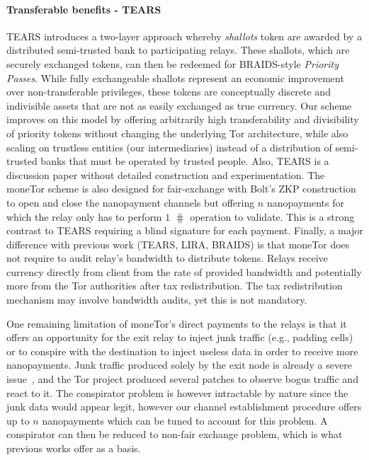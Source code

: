 \paragraph*{Transferable benefits - TEARS} TEARS introduces a two-layer approach whereby \emph{shallots}
token are awarded by a distributed semi-trusted bank to participating relays. These shallots,
which are securely exchanged tokens, can then be redeemed for BRAIDS-style
\emph{Priority Passes}. While fully exchangeable shallots represent an economic
improvement over non-transferable privileges, these tokens are conceptually
discrete and indivisible assets that are not as easily exchanged as true
currency. Our scheme improves on this model by offering arbitrarily high
transferability and divisibility of priority tokens without changing the
underlying Tor architecture, while also scaling on trustless entities (our intermediaries) instead of a distribution of semi-trusted banks that must be operated by trusted people. Also, TEARS is a discussion paper without detailed construction and experimentation. The moneTor scheme is also designed for fair-exchange with Bolt's ZKP construction to open and close the nanopayment channels but offering $n$ nanopayments for which the relay only has to perform $1$ $\hash$ operation to validate. This is a strong contrast to TEARS requiring a blind signature for each payment. Finally, a major difference with previous work (TEARS, LIRA, BRAIDS) is that moneTor does not require to audit relay's bandwidth to distribute tokens. Relays receive currency directly from client from the rate of provided bandwidth and potentially more from the Tor authorities after tax redistribution. The tax redistribution mechanism may involve bandwidth audits, yet this is not mandatory.

One remaining limitation of moneTor's direct payments to the relays is
that it offers an opportunity for the exit relay to inject junk
traffic (e.g., padding cells) or to conspire with the destination to
inject useless data in order to receive more nanopayments. Junk
traffic produced solely by the exit node is already a severe
issue~\cite{rochet2018dropping}, and the Tor project produced several
patches to observe bogus traffic and react to it. The conspirator
problem is however intractable by nature since the junk data would
appear legit, however our channel establishment procedure offers up to
$n$ nanopayments which can be tuned to account for this problem.  A
conspirator can then be reduced to non-fair exchange problem, which is
what previous works offer as a basis.



